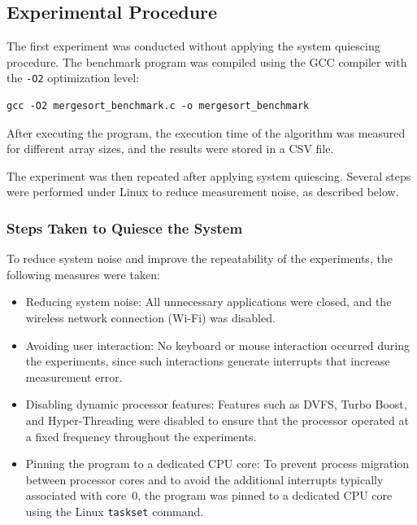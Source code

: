 \documentclass{article}
\begin{document}
\subsection{Experimental Procedure}

The first experiment was conducted without applying the system quiescing procedure. The benchmark program was compiled using the GCC compiler with the \texttt{-O2} optimization level:

\begin{verbatim}
gcc -O2 mergesort_benchmark.c -o mergesort_benchmark
\end{verbatim}

After executing the program, the execution time of the algorithm was measured for different array sizes, and the results were stored in a CSV file.

The experiment was then repeated after applying system quiescing. Several steps were performed under Linux to reduce measurement noise, as described below.


\subsubsection{Steps Taken to Quiesce the System}

To reduce system noise and improve the repeatability of the experiments, the following measures were taken:

\begin{itemize}
    \item Reducing system noise: All unnecessary applications were closed, and the wireless network connection (Wi-Fi) was disabled.

    \item Avoiding user interaction: No keyboard or mouse interaction occurred during the experiments, since such interactions generate interrupts that increase measurement error.

    \item Disabling dynamic processor features: Features such as DVFS, Turbo Boost, and Hyper-Threading were disabled to ensure that the processor operated at a fixed frequency throughout the experiments.

    \item Pinning the program to a dedicated CPU core: To prevent process migration between processor cores and to avoid the additional interrupts typically associated with core~0, the program was pinned to a dedicated CPU core using the Linux \texttt{taskset} command.
\end{itemize}
\end{document}

